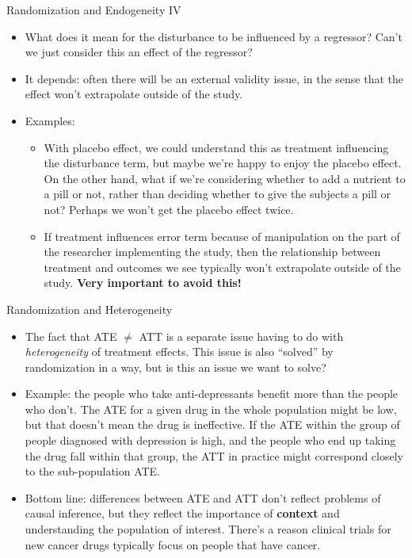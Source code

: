 \documentclass[aspectratio=169,11pt]{beamer}
\begin{document}
\begin{frame}{Randomization and Endogeneity IV}
\begin{itemize}
  \item What does it mean for the disturbance to be influenced by a regressor? 
  Can't we just consider this an effect of the regressor?
  
  \medskip
  \item It depends: often there will be an external validity issue, in the sense that
  the effect won't extrapolate outside of the study.
  
  \medskip
  \item Examples:
  \begin{itemize}
    \item With placebo effect, we could understand this as treatment influencing the
    disturbance term, but maybe we're happy to enjoy the placebo effect. On the other hand,
    what if we're considering whether to add a nutrient to a pill or not, rather than deciding
    whether to give the subjects a pill or not? Perhaps we won't get the placebo effect twice. 
    
    \item If treatment influences error term because of manipulation on the part of the researcher
    implementing the study, then the relationship between treatment and outcomes we see
    typically won't extrapolate outside of the study. {\bf Very important to avoid this!}
  \end{itemize}
\end{itemize}
\end{frame}





\begin{frame}{Randomization and Heterogeneity}
\begin{itemize}
  \item The fact that ATE $\ne$ ATT is a separate issue having to do with \emph{heterogeneity} of treatment effects.
  This issue is also ``solved'' by randomization in a way, but is this an issue we want to solve?

  \medskip
  \item Example: the people who take anti-depressants benefit more than the people who don't.
  The ATE for a given drug in the whole population might be low, but that doesn't mean the drug is
  ineffective. If the ATE within the group of people diagnosed with depression is high, and the people
  who end up taking the drug fall within that group, the ATT in practice might correspond closely to the sub-population ATE.

  \medskip
  \item Bottom line: differences between ATE and ATT don't reflect problems of causal inference, but they
  reflect the importance of {\bf context} and understanding the population of interest.
   There's a reason clinical trials for new cancer drugs typically focus on people that have cancer.


\end{itemize}
\end{frame}
\end{document}
